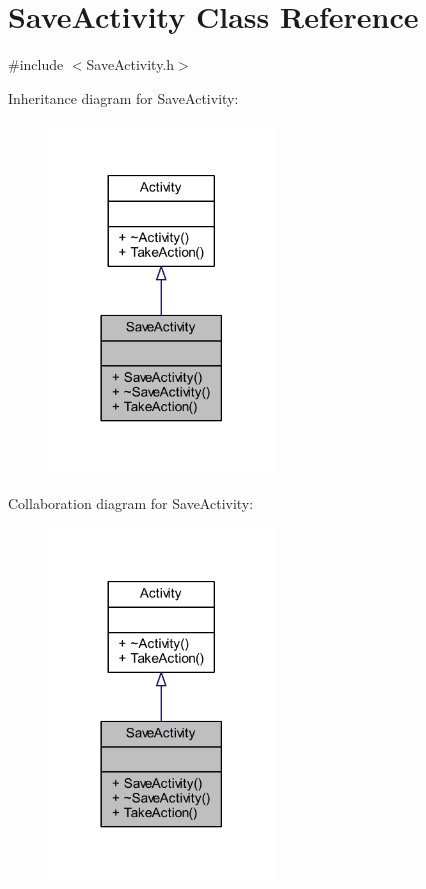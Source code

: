 \hypertarget{class_save_activity}{}\section{Save\+Activity Class Reference}
\label{class_save_activity}


{\ttfamily \#include $<$Save\+Activity.\+h$>$}



Inheritance diagram for Save\+Activity\+:
\nopagebreak
\begin{figure}[H]
\begin{center}
\leavevmode
\includegraphics[width=170pt]{class_save_activity__inherit__graph}
\end{center}
\end{figure}


Collaboration diagram for Save\+Activity\+:
\nopagebreak
\begin{figure}[H]
\begin{center}
\leavevmode
\includegraphics[width=170pt]{class_save_activity__coll__graph}
\end{center}
\end{figure}
